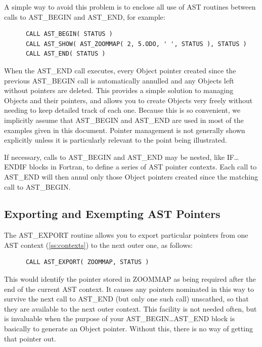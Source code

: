 \documentclass[twoside,11pt]{article}
\newcommand{\htmlref}[2]{#1}
\newcommand{\secref}[1]{\S\ref{#1}}
\renewcommand{\secref}[1]{\ref{#1}}
\begin{document}
A simple way to avoid this problem is to enclose all use of AST
routines between calls to \htmlref{AST\_BEGIN}{AST_BEGIN} and \htmlref{AST\_END}{AST_END}, for example:

\small
\begin{verbatim}
      CALL AST_BEGIN( STATUS )
      CALL AST_SHOW( AST_ZOOMMAP( 2, 5.ODO, ' ', STATUS ), STATUS )
      CALL AST_END( STATUS )
\end{verbatim}
\normalsize

When the AST\_END call executes, every \htmlref{Object}{Object} pointer created since
the previous AST\_BEGIN call is automatically annulled and any Objects
left without pointers are deleted. This provides a simple solution to
managing Objects and their pointers, and allows you to create Objects
very freely without needing to keep detailed track of each one.
Because this is so convenient, we implicitly assume that AST\_BEGIN
and AST\_END are used in most of the examples given in this document.
Pointer management is not generally shown explicitly unless it is
particularly relevant to the point being illustrated.

If necessary, calls to AST\_BEGIN and AST\_END may be nested, like
IF\ldots ENDIF blocks in Fortran, to define a series of AST pointer
contexts. Each call to AST\_END will then annul only those Object
pointers created since the matching call to AST\_BEGIN.

\subsection{Exporting and Exempting AST Pointers}
The \htmlref{AST\_EXPORT}{AST_EXPORT} routine allows you to export particular pointers from
one AST context (\secref{ss:contexts}) to the next outer one, as
follows:

\small
\begin{verbatim}
      CALL AST_EXPORT( ZOOMMAP, STATUS )
\end{verbatim}
\normalsize

This would identify the pointer stored in ZOOMMAP as being required after
the end of the current AST context. It causes any pointers nominated
in this way to survive the next call to \htmlref{AST\_END}{AST_END} (but only one such
call) unscathed, so that they are available to the next outer context.
This facility is not needed often, but is invaluable when the purpose
of your \htmlref{AST\_BEGIN}{AST_BEGIN}\ldots AST\_END block is basically to generate an
\htmlref{Object}{Object} pointer. Without this, there is no way of getting that pointer
out.
\end{document}
